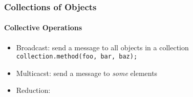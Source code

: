 \begin{frame}[fragile]

  \frametitle{Collections of Objects}
  \framesubtitle{Collective Operations}

  \begin{itemize}
    \item Broadcast: send a message to all objects in a collection \\
      \lstinline{collection.method(foo, bar, baz);}
    \item Multicacst: send a message to \emph{some} elements
    \item Reduction: 
  \end{itemize}

\end{frame}




